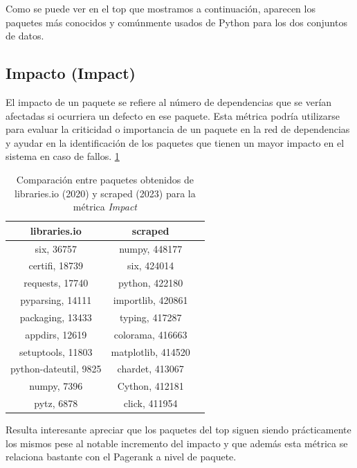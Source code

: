 Como se puede ver en el top que mostramos a continuación, aparecen los paquetes más conocidos y
comúnmente usados de Python para los dos conjuntos de datos.

\subsection{Impacto (Impact)}

El impacto de un paquete se refiere al número de dependencias que se verían afectadas si
ocurriera un defecto en ese paquete. Esta métrica podría utilizarse para evaluar la criticidad
o importancia de un paquete en la red de dependencias y ayudar en la identificación de los
paquetes que tienen un mayor impacto en el sistema en caso de fallos. \ref{tab:Comparación entre paquetes obtenidos de libraries.io (2020) y scraped (2023) para la métrica Impact}

\begin{table}[ht!]
    \centering
    \caption{Comparación entre paquetes obtenidos de libraries.io (2020) y scraped (2023) para la métrica \textit{Impact}}
    \begin{tabular}{|c|c|c|}
        \hline
        \textbf{libraries.io} & \textbf{scraped}   \\
        \hline
        six, 36757            & numpy, 448177      \\
        certifi, 18739        & six, 424014        \\
        requests, 17740       & python, 422180     \\
        pyparsing, 14111      & importlib, 420861  \\
        packaging, 13433      & typing, 417287     \\
        appdirs, 12619        & colorama, 416663   \\
        setuptools, 11803     & matplotlib, 414520 \\
        python-dateutil, 9825 & chardet, 413067    \\
        numpy, 7396           & Cython, 412181     \\
        pytz, 6878            & click, 411954      \\
        \hline
    \end{tabular}
    \label{tab:Comparación entre paquetes obtenidos de libraries.io (2020) y scraped (2023) para la métrica Impact}
\end{table}


Resulta interesante apreciar que los paquetes del top siguen siendo prácticamente los mismos
pese al notable incremento del impacto y que además esta métrica se relaciona bastante con el
Pagerank a nivel de paquete.

